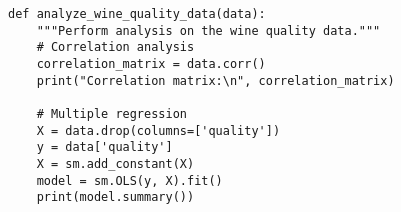 \begin{lstlisting}[caption=Red Wine Quality Analysis Code]
def analyze_wine_quality_data(data):
    """Perform analysis on the wine quality data."""
    # Correlation analysis
    correlation_matrix = data.corr()
    print("Correlation matrix:\n", correlation_matrix)

    # Multiple regression
    X = data.drop(columns=['quality'])
    y = data['quality']
    X = sm.add_constant(X)
    model = sm.OLS(y, X).fit()
    print(model.summary())
\end{lstlisting} 